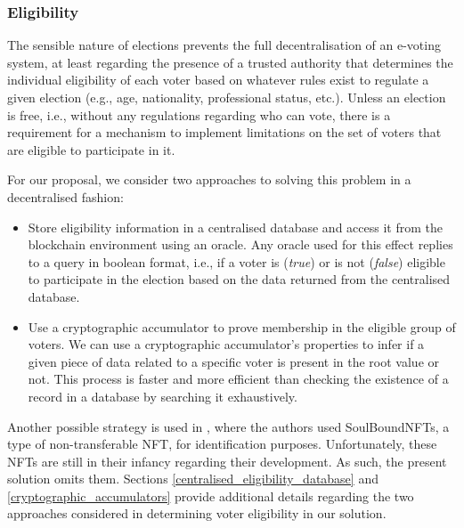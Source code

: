 \documentclass[../main.tex]{subfiles}
\begin{document}
\subsubsection{Eligibility}
\label{voter_eligibility}
The sensible nature of elections prevents the full decentralisation of an e-voting system, at least regarding the presence of a trusted authority that determines the individual eligibility of each voter based on whatever rules exist to regulate a given election (e.g., age, nationality, professional status, etc.). Unless an election is free, i.e., without any regulations regarding who can vote, there is a requirement for a mechanism to implement limitations on the set of voters that are eligible to participate in it.
\par
For our proposal, we consider two approaches to solving this problem in a decentralised fashion:
\begin{itemize}

    \item{Store eligibility information in a centralised database and access it from the blockchain environment using an oracle. Any oracle used for this effect replies to a query in boolean format, i.e., if a voter is (\textit{true})} or is not (\textit{false}) eligible to participate in the election based on the data returned from the centralised database.

    \item{Use a cryptographic accumulator to prove membership in the eligible group of voters. We can use a cryptographic accumulator's properties to infer if a given piece of data related to a specific voter is present in the root value or not. This process is faster and more efficient than checking the existence of a record in a database by searching it exhaustively.}

\end{itemize}

Another possible strategy is used in \cite{Sagar2023}, where the authors used SoulBoundNFTs, a type of non-transferable NFT, for identification purposes. Unfortunately, these NFTs are still in their infancy regarding their development. As such, the present solution omits them. Sections \ref{centralised_eligibility_database} and \ref{cryptographic_accumulators} provide additional details regarding the two approaches considered in determining voter eligibility in our solution.
\end{document}
